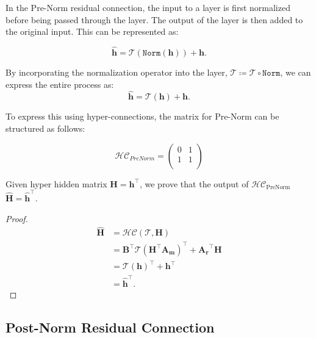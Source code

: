 In the Pre-Norm residual connection, the input to a layer is first normalized before being passed through the layer. The output of the layer is then added to the original input. This can be represented as:

\begin{equation}
    \mathbf{\hat{h}} = \mathcal{T}(\texttt{Norm}(\mathbf{h})) + \mathbf{h}.
\end{equation}

By incorporating the normalization operator into the layer, $\mathcal{T}\coloneqq\mathcal{T}\circ \texttt{Norm}$, we can express the entire process as:
\begin{equation}
    \mathbf{\hat{h}} = \mathcal{T}(\mathbf{h}) + \mathbf{h}.
\end{equation}

To express this using hyper-connections, the matrix for Pre-Norm can be structured as follows:

\begin{equation}
\mathcal{HC}_{PreNorm}=\begin{pmatrix}
0 & 1 \\
1 & 1 \\
\end{pmatrix}
\end{equation}

Given hyper hidden matrix $\mathbf{H}=\mathbf{h}^\intercal$, we prove that the output of $\mathcal{HC}_{\text{PreNorm}}$ $\mathbf{\hat{H}}=\mathbf{\hat{h}}^\intercal$.

\begin{proof}
\begin{equation}
\begin{aligned}
    \mathbf{\hat{H}} &= \mathcal{HC}(\mathcal{T}, \mathbf{H}) \\
                    &=\mathbf{B}^\intercal\mathcal{T}(\mathbf{H}^\intercal\mathbf{A_m})^\intercal + \mathbf{A_r}^\intercal\mathbf{H} \\
                    &=\mathcal{T}(\mathbf{h})^\intercal + \mathbf{h}^\intercal \\
                    &=\mathbf{\hat{h}}^\intercal.
\end{aligned}
\end{equation}
\end{proof}

\subsection{Post-Norm Residual Connection}

